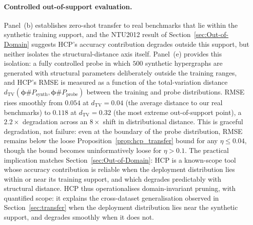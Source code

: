 \documentclass[10pt]{article}
\theoremstyle{plain}
\theoremstyle{definition}
\begin{document}
\paragraph{Controlled out-of-support evaluation.} Panel~(b) establishes zero-shot transfer to real benchmarks that lie within the synthetic training support, and the NTU2012 result of Section~\ref{sec:Out-of-Domain} suggests HCP's accuracy contribution degrades outside this support, but neither isolates the structural-distance axis itself. Panel~(e) provides this isolation: a fully controlled probe in which $500$ synthetic hypergraphs are generated with structural parameters deliberately outside the training ranges, and HCP's RMSE is measured as a function of the total-variation distance $d_{\mathrm{TV}}(\boldsymbol{\phi}\#P_{\mathrm{synth}}, \boldsymbol{\phi}\#P_{\mathrm{probe}})$ between the training and probe distributions. RMSE rises smoothly from $0.054$ at $d_{\mathrm{TV}}\!=\!0.04$ (the average distance to our real benchmarks) to $0.118$ at $d_{\mathrm{TV}}\!=\!0.32$ (the most extreme out-of-support point), a $2.2\times$ degradation across an $8\times$ shift in distributional distance. This is graceful degradation, not failure: even at the boundary of the probe distribution, RMSE remains below the loose Proposition~\ref{prop:hcp_transfer} bound for any $\eta\!\leq\!0.04$, though the bound becomes uninformatively loose for $\eta\!>\!0.1$. The practical implication matches Section~\ref{sec:Out-of-Domain}: HCP is a known-scope tool whose accuracy contribution is reliable when the deployment distribution lies within or near its training support, and which degrades predictably with structural distance. HCP thus operationalises domain-invariant pruning, with quantified scope: it explains the cross-dataset generalisation observed in Section~\ref{sec:transfer} when the deployment distribution lies near the synthetic support, and degrades smoothly when it does not.

\end{document}
